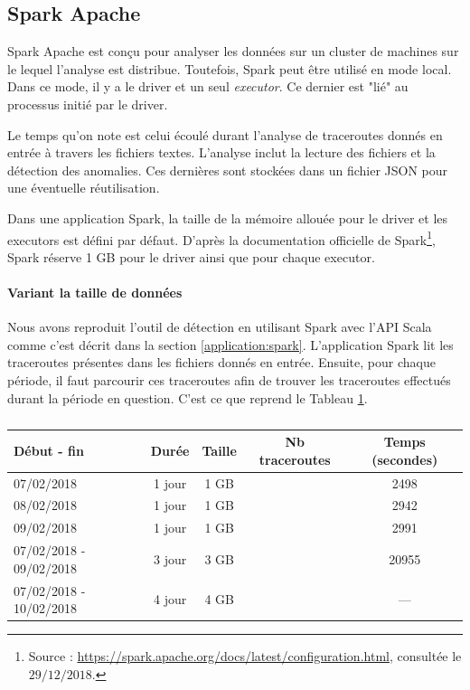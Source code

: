\subsection{Spark Apache}


Spark Apache est conçu pour analyser les données sur un cluster de machines sur le lequel l'analyse est distribue. Toutefois, Spark peut être utilisé en mode local. Dans ce mode, il y a le driver et un seul \textit{executor}. Ce dernier est "lié" au processus initié par le driver. 
 
  
Le temps qu'on note est celui écoulé durant l'analyse de traceroutes donnés en entrée à travers les fichiers textes. L'analyse inclut la lecture des fichiers et la détection des anomalies. Ces dernières sont stockées dans un fichier JSON pour une éventuelle réutilisation.



 

Dans une application Spark, la taille de la mémoire allouée pour le driver et les executors est  défini par défaut. D'après la documentation officielle de Spark\footnote{Source : \url{https://spark.apache.org/docs/latest/configuration.html}, consultée le $29/12/2018$.}, Spark réserve 1 GB pour le driver ainsi que pour chaque executor. 

\paragraph{Variant la taille de données}

Nous avons reproduit l'outil de détection en utilisant Spark avec l'API Scala comme c'est décrit dans la section \ref{application:spark}. L'application Spark lit les traceroutes présentes dans les fichiers donnés en entrée. Ensuite, pour chaque période, il faut parcourir ces traceroutes afin de trouver les traceroutes effectués durant la période en question. C'est ce que reprend le Tableau \ref{tab:spark-timing}. 

\begin{table}[H]
	\begin{tabular}{lcccc}
		\textbf{Début - fin} &\textbf{Durée}  & \textbf{Taille}  & \textbf{Nb traceroutes} & \textbf{Temps (secondes)} \\ \hline
		
		07/02/2018&1 jour&1 GB&& 2498\\ \hline
		08/02/2018&1 jour&1 GB&& 2942\\ \hline
		09/02/2018&1 jour& 1 GB&& 2991\\ \hline
		07/02/2018 - 09/02/2018&3 jour& 3 GB&& 20955\\ \hline
		07/02/2018 - 10/02/2018&4 jour& 4 GB& & --- \\ \hline
	\end{tabular}
	\caption{}
	\label{tab:spark-timing}
\end{table}

